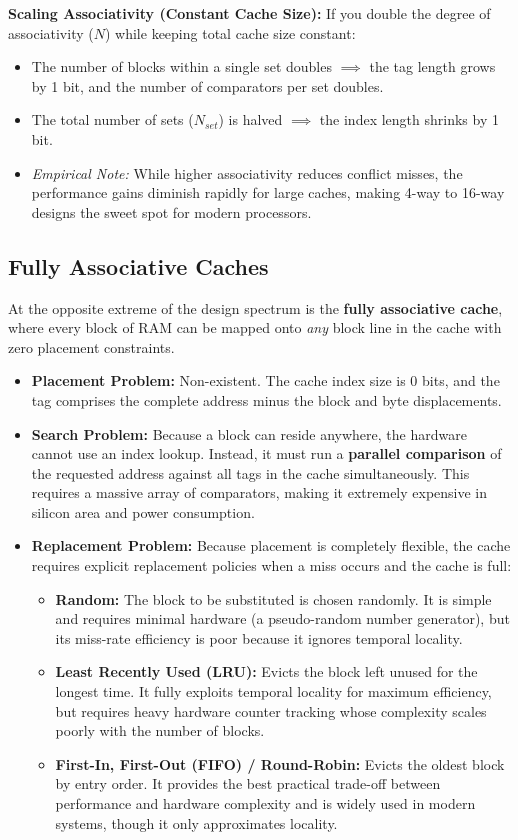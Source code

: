 \noindent \textbf{Scaling Associativity (Constant Cache Size):}
If you double the degree of associativity ($N$) while keeping total cache size constant:
\begin{itemize}
    \item The number of blocks within a single set doubles $\implies$ the tag length grows by 1 bit, and the number of comparators per set doubles.
    \item The total number of sets ($N_{set}$) is halved $\implies$ the index length shrinks by 1 bit.
    \item \emph{Empirical Note:} While higher associativity reduces conflict misses, the performance gains diminish rapidly for large caches, making 4-way to 16-way designs the sweet spot for modern processors.
\end{itemize}

\subsection{Fully Associative Caches}
At the opposite extreme of the design spectrum is the \textbf{fully associative cache}, where every block of RAM can be mapped onto \emph{any} block line in the cache with zero placement constraints.
\begin{itemize}
    \item \textbf{Placement Problem:} Non-existent. The cache index size is $0$ bits, and the tag comprises the complete address minus the block and byte displacements.
    \item \textbf{Search Problem:} Because a block can reside anywhere, the hardware cannot use an index lookup. Instead, it must run a \textbf{parallel comparison} of the requested address against all tags in the cache simultaneously. This requires a massive array of comparators, making it extremely expensive in silicon area and power consumption.
    \item \textbf{Replacement Problem:} Because placement is completely flexible, the cache requires explicit replacement policies when a miss occurs and the cache is full:
    \begin{itemize}
        \item \textbf{Random:} The block to be substituted is chosen randomly. It is simple and requires minimal hardware (a pseudo-random number generator), but its miss-rate efficiency is poor because it ignores temporal locality.
        \item \textbf{Least Recently Used (LRU):} Evicts the block left unused for the longest time. It fully exploits temporal locality for maximum efficiency, but requires heavy hardware counter tracking whose complexity scales poorly with the number of blocks.
        \item \textbf{First-In, First-Out (FIFO) / Round-Robin:} Evicts the oldest block by entry order. It provides the best practical trade-off between performance and hardware complexity and is widely used in modern systems, though it only approximates locality.
    \end{itemize}
\end{itemize}


